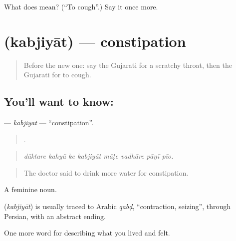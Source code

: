 \begin{tcolorbox}[breakable,colback=teal!4,colframe=teal!35!black,title={Before you move on}]
What does  mean? (\textquotedblleft{}To cough\textquotedblright{}.) Say it once more.
\end{tcolorbox}
\section[\texorpdfstring{\gu{કબજિયાત} (kabjiyāt)}{કબજિયાત (kabjiyāt)}]{ (kabjiyāt) — constipation}

\label{lesson:GU-C478-kabjiyat}



\begin{quote}
Before the new one: say the Gujarati for a scratchy throat, then the Gujarati for to cough.
\end{quote}

\subsection*{You'll want to know: }
\textbf{} — \emph{kabjiyāt} — \textquotedblleft{}constipation\textquotedblright{}.

\begin{quote}
       .
\end{quote}

\begin{quote}
\emph{dāktare kahyũ ke kabjiyāt māṭe vadhāre pāṇī pīo.}
\end{quote}

\begin{quote}
The doctor said to drink more water for constipation.
\end{quote}

A feminine noun.

\begin{cousinweb}
\textbf{} (\emph{kabjiyāt}) is usually traced to Arabic \emph{qabḍ}, \textquotedblleft{}contraction, seizing\textquotedblright{}, through Persian, with an abstract ending.
\end{cousinweb}

\begin{grammarlens}[title={What you've built}]
One more word for describing what you lived and felt.
\end{grammarlens}

